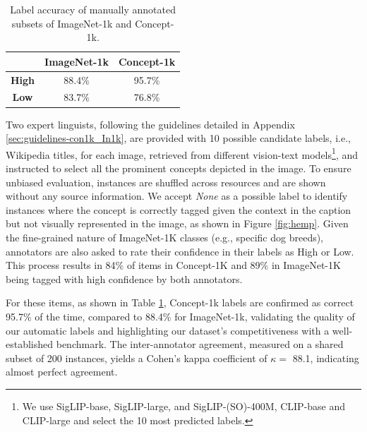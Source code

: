 \documentclass[11pt]{article}
\begin{document}
\begin{table}
\centering
\setlength{\tabcolsep}{10pt} 
\begin{tabular}{c c c}
\toprule
\textbf{}        & \textbf{ImageNet-1k}    & \textbf{Concept-1k} \\ 
\midrule
\textbf{High}    & 88.4\%            & 95.7\%  \\ 
\textbf{Low}     & 83.7\%            & 76.8\%  
\\ 
\bottomrule
\end{tabular}
\caption{Label accuracy of manually annotated subsets of ImageNet-1k and Concept-1k.}
\label{tab:conc_vs_in}
\end{table}




Two expert linguists, following the guidelines detailed in Appendix \ref{sec:guidelines-con1k_In1k}, are provided with 10 possible candidate labels, i.e., Wikipedia titles, for each image, retrieved from different vision-text models\footnote{We use SigLIP-base, SigLIP-large, and SigLIP-(SO)-400M, CLIP-base and CLIP-large and select the 10 most predicted labels.}, and instructed to select all the prominent concepts depicted in the image. To ensure unbiased evaluation, instances are shuffled across resources and are shown without any source information. %
We accept \textit{None} as a possible label to identify instances where the concept is correctly tagged given the context in the caption but not visually represented in the image, as shown in Figure \ref{fig:hemp}. 
Given the fine-grained nature of ImageNet-1K classes (e.g., specific dog breeds), annotators are also asked to rate their confidence in their labels as High or Low. 
This process results in 84\% of items in Concept-1K and 89\% in ImageNet-1K being tagged with high confidence by both annotators.


For these items, as shown in Table \ref{tab:conc_vs_in}, Concept-1k labels are confirmed as correct 95.7\% of the time, compared to 88.4\% for ImageNet-1k, validating the quality of our automatic labels and highlighting our dataset’s competitiveness with a well-established benchmark.  
The inter-annotator agreement, measured on a shared subset of 200 instances, yields a Cohen’s kappa coefficient of $\kappa =$ 88.1, indicating almost perfect agreement.
\end{document}
